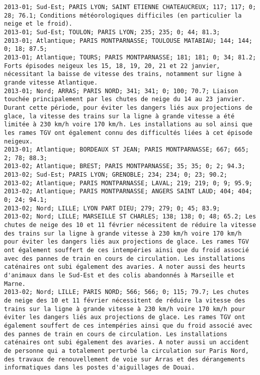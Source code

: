 \documentclass{article}
\begin{document}
\begin{Verbatim}[commandchars=\\\{\}]
2013-01; Sud-Est; PARIS LYON; SAINT ETIENNE CHATEAUCREUX; 117; 117; 0; 28; 76.1; Conditions météorologiques difficiles (en particulier la neige et le froid).
2013-01; Sud-Est; TOULON; PARIS LYON; 235; 235; 0; 44; 81.3; 
2013-01; Atlantique; PARIS MONTPARNASSE; TOULOUSE MATABIAU; 144; 144; 0; 18; 87.5; 
2013-01; Atlantique; TOURS; PARIS MONTPARNASSE; 181; 181; 0; 34; 81.2; Forts épisodes neigeux les 15, 18, 19, 20, 21 et 22 janvier, nécessitant la baisse de vitesse des trains, notamment sur ligne à grande vitesse Atlantique.
2013-01; Nord; ARRAS; PARIS NORD; 341; 341; 0; 100; 70.7; Liaison touchée principalement par les chutes de neige du 14 au 23 janvier. Durant cette période, pour éviter les dangers liés aux projections de glace, la vitesse des trains sur la ligne à grande vitesse a été limitée à 230 km/h voire 170 km/h. Les installations au sol ainsi que les rames TGV ont également connu des difficultés liées à cet épisode neigeux.
2013-01; Atlantique; BORDEAUX ST JEAN; PARIS MONTPARNASSE; 667; 665; 2; 78; 88.3; 
2013-02; Atlantique; BREST; PARIS MONTPARNASSE; 35; 35; 0; 2; 94.3; 
2013-02; Sud-Est; PARIS LYON; GRENOBLE; 234; 234; 0; 23; 90.2; 
2013-02; Atlantique; PARIS MONTPARNASSE; LAVAL; 219; 219; 0; 9; 95.9; 
2013-02; Atlantique; PARIS MONTPARNASSE; ANGERS SAINT LAUD; 404; 404; 0; 24; 94.1; 
2013-02; Nord; LILLE; LYON PART DIEU; 279; 279; 0; 45; 83.9; 
2013-02; Nord; LILLE; MARSEILLE ST CHARLES; 138; 138; 0; 48; 65.2; Les chutes de neige des 10 et 11 février nécessitent de réduire la vitesse des trains sur la ligne à grande vitesse à 230 km/h voire 170 km/h pour éviter les dangers liés aux projections de glace. Les rames TGV ont également souffert de ces intempéries ainsi que du froid associé avec des pannes de train en cours de circulation. Les installations caténaires ont subi également des avaries. A noter aussi des heurts d'animaux dans le Sud-Est et des colis abandonnés à Marseille et Marne.
2013-02; Nord; LILLE; PARIS NORD; 566; 566; 0; 115; 79.7; Les chutes de neige des 10 et 11 février nécessitent de réduire la vitesse des trains sur la ligne à grande vitesse à 230 km/h voire 170 km/h pour éviter les dangers liés aux projections de glace. Les rames TGV ont également souffert de ces intempéries ainsi que du froid associé avec des pannes de train en cours de circulation. Les installations caténaires ont subi également des avaries. A noter aussi un accident de personne qui a totalement perturbé la circulation sur Paris Nord, des travaux de renouvellement de voie sur Arras et des dérangements informatiques dans les postes d'aiguillages de Douai.

\end{Verbatim}
\end{document}
